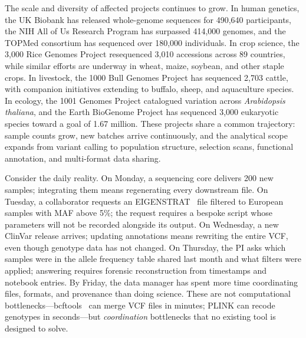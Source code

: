 \documentclass[pdflatex,sn-nature]{sn-jnl}
\begin{document}
The scale and diversity of affected projects continues to grow. In human genetics, the UK Biobank has released whole-genome sequences for 490,640 participants, the NIH All of Us Research Program has surpassed 414,000 genomes, and the TOPMed consortium has sequenced over 180,000 individuals. In crop science, the 3,000 Rice Genomes Project resequenced 3,010 accessions across 89 countries, while similar efforts are underway in wheat, maize, soybean, and other staple crops. In livestock, the 1000 Bull Genomes Project has sequenced 2,703 cattle, with companion initiatives extending to buffalo, sheep, and aquaculture species. In ecology, the 1001 Genomes Project catalogued variation across \textit{Arabidopsis thaliana}, and the Earth BioGenome Project has sequenced 3,000 eukaryotic species toward a goal of 1.67 million. These projects share a common trajectory: sample counts grow, new batches arrive continuously, and the analytical scope expands from variant calling to population structure, selection scans, functional annotation, and multi-format data sharing.

Consider the daily reality. On Monday, a sequencing core delivers 200 new samples; integrating them means regenerating every downstream file. On Tuesday, a collaborator requests an EIGENSTRAT~\cite{patterson2006eigenstrat} file filtered to European samples with MAF above 5\%; the request requires a bespoke script whose parameters will not be recorded alongside its output. On Wednesday, a new ClinVar release arrives; updating annotations means rewriting the entire VCF, even though genotype data has not changed. On Thursday, the PI asks which samples were in the allele frequency table shared last month and what filters were applied; answering requires forensic reconstruction from timestamps and notebook entries. By Friday, the data manager has spent more time coordinating files, formats, and provenance than doing science. These are not computational bottlenecks---bcftools~\cite{danecek2021bcftools} can merge VCF files in minutes; PLINK can recode genotypes in seconds---but \textit{coordination} bottlenecks that no existing tool is designed to solve.
\end{document}

